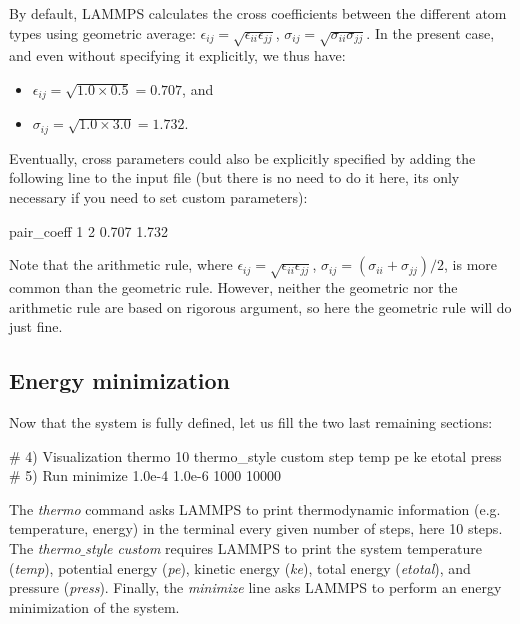 \begin{tcolorbox}[colback=mylightblue!5!white,colframe=mylightblue!75!black,title=About cross parameters]
By default, LAMMPS calculates the cross coefficients between the different atom types
using geometric average: 
$\epsilon_{ij} = \sqrt{\epsilon_{ii} \epsilon_{jj}}$,
$\sigma_{ij} = \sqrt{\sigma_{ii} \sigma_{jj}}$. 
In the present case, and even without specifying it explicitly, we thus have:
\begin{itemize}
\item $\epsilon_{ij} = \sqrt{1.0 \times 0.5} = 0.707$, and 
\item $\sigma_{ij} = \sqrt{1.0 \times 3.0} = 1.732$.
\end{itemize}
Eventually, cross parameters could also be explicitly specified by adding the following 
line to the input file (but there is no need to do it here, its only necessary if you need 
to set custom parameters):
\begin{lcverbatim}

pair_coeff 1 2 0.707 1.732 
\end{lcverbatim}

\noindent Note that the arithmetic rule, where 
$\epsilon_{ij} = \sqrt{\epsilon_{ii} \epsilon_{jj}}$,
$\sigma_{ij} = (\sigma_{ii}+\sigma_{jj})/2$, 
is more common than the geometric rule. However, neither the geometric nor the
arithmetic rule are based on rigorous argument, so here
the geometric rule will do just fine. 
\end{tcolorbox}

\noindent \subsection{Energy minimization}

Now that the system is fully defined, let us fill the two last remaining sections:

\begin{lcverbatim}
# 4) Visualization
thermo 10
thermo_style custom step temp pe ke etotal press
# 5) Run
minimize 1.0e-4 1.0e-6 1000 10000
\end{lcverbatim}

\noindent The \textit{thermo} command asks LAMMPS to print
thermodynamic information (e.g. temperature, energy) in the
terminal every given number of steps, here 10 steps. 
The \textit{thermo$\_$style custom} requires LAMMPS to print 
the system temperature (\textit{temp}), potential energy (\textit{pe}),
kinetic energy (\textit{ke}), total energy (\textit{etotal}),
and pressure (\textit{press}). Finally, the \textit{minimize} line
asks LAMMPS to perform an energy minimization of the system.

